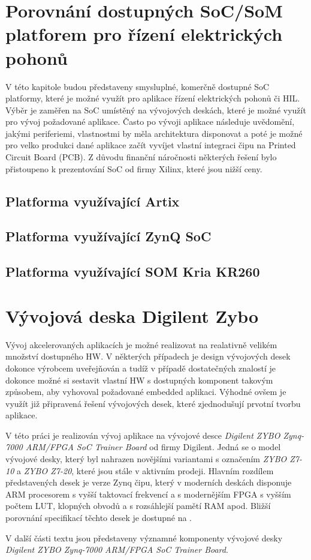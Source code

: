 \documentclass[a4paper, twoside, 11pt]{article}
\begin{document}
	\section{Porovnání dostupných SoC/SoM platforem pro řízení elektrických pohonů}
			V této kapitole budou představeny smysluplné, komerčně dostupné SoC platformy, které je možné využít pro aplikace řízení elektrických pohonů či HIL. Výběr je zaměřen na SoC umístěný na vývojových deskách, které je možné využít pro vývoj požadované aplikace. Často po vývoji aplikace následuje uvědomění, jakými periferiemi, vlastnostmi by měla architektura disponovat a poté je možné pro velko produkci dané aplikace začít vyvíjet vlastní integraci čipu na Printed Circuit Board (PCB). Z důvodu finanční náročnosti některých řešení bylo přistoupeno k prezentování SoC od firmy Xilinx, které jsou nižší ceny.

			

			\subsection{Platforma využívající Artix}

			\subsection{Platforma využívající ZynQ SoC}

			\subsection{Platforma využívající SOM Kria KR260}


	\section{Vývojová deska Digilent Zybo}
			Vývoj akcelerovaných aplikacích je možné realizovat na realativně velikém množství dostupného HW. V některých případech je design vývojových desek dokonce výrobcem uveřejňován a tudíž v případě dostatečných znalostí je dokonce možné si sestavit vlastní HW s dostupných komponent takovým způsobem, aby vyhovoval požadované embedded aplikaci. Výhodné ovšem je využít již připravená řešení vývojových desek, které zjednodušují prvotní tvorbu aplikace.\par
			V této práci je realizován vývoj aplikace na vývojové desce \textit{Digilent ZYBO Zynq-7000 ARM/FPGA SoC Trainer Board} od firmy Digilent. \cite{digilent-zybo-7000-docs} Jedná se o model vývojové desky, který byl nahrazen novějšími variantami s označením \textit{ZYBO Z7-10} a \textit{ZYBO Z7-20}, které jsou stále v aktivním prodeji. Hlavním rozdílem představených desek je verze Zynq čipu, který v moderních deskách disponuje ARM procesorem s vyšší taktovací frekvencí a s modernějším FPGA s vyšším počtem LUT, klopných obvodů a s rozsáhlejší pamětí RAM apod. Bližší porovnání specifikací těchto desek je dostupné na \cite{digilent-zybo-compare}.\par
			V další části textu jsou představeny významné komponenty vývojové desky \textit{Digilent ZYBO Zynq-7000 ARM/FPGA SoC Trainer Board}.
\end{document}
